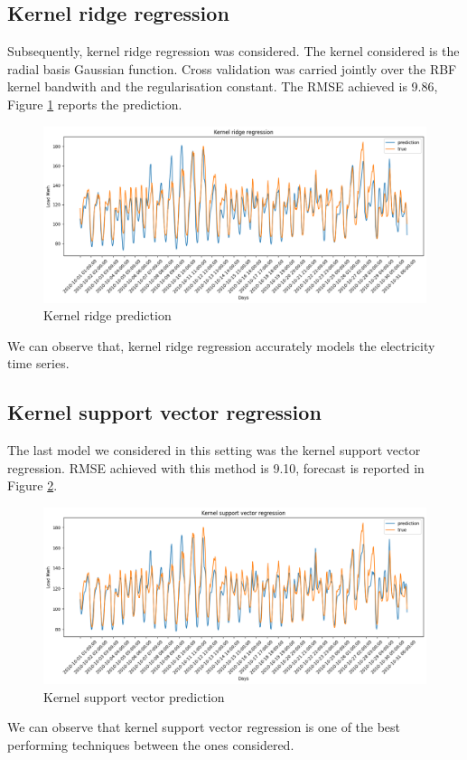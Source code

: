 \subsection{Kernel ridge regression}
Subsequently, kernel ridge regression was considered. The kernel considered is the radial basis Gaussian function.
Cross validation was carried jointly over the RBF kernel bandwith and the regularisation constant.
The RMSE achieved is 9.86, Figure \ref{fig:krnridge_price} reports the prediction.
\begin{figure}[!h]
    \includegraphics[width=\textwidth]{images/krnridge_price.png}
    \caption{Kernel ridge prediction}
    \label{fig:krnridge_price}
\end{figure}
We can observe that, kernel ridge regression accurately models the electricity time series.

\subsection{Kernel support vector regression}
The last model we considered in this setting was the kernel support vector regression.
RMSE achieved with this method is 9.10, forecast is reported in Figure \ref{fig:krnsvr_price}.

\begin{figure}[!h]
    \includegraphics[width=\textwidth]{images/krnsvr_price.png}
    \caption{Kernel support vector prediction}
    \label{fig:krnsvr_price}
\end{figure}
We can observe that kernel support vector regression is one of the best performing techniques between the ones considered.

